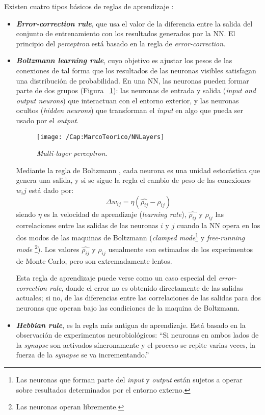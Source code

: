 Existen cuatro tipos básicos de reglas de aprendizaje \cite{Jain:1996:ANN-AT}:
\begin{itemize}
  \item \textbf{\textit{Error-correction rule}}, que usa el valor de la 
  diferencia entre la salida del conjunto de entrenamiento con los resultados
  generados por la NN. El principio del \textit{perceptron} está basado en la 
  regla de \textit{error-correction}.  
  \item \textbf{\textit{Boltzmann learning rule}}, cuyo objetivo es ajustar 
  los pesos de las conexiones de tal forma que los resultados de las neuronas 
  visibles satisfagan una distribución de probabilidad. En una NN, las
  neuronas pueden formar parte de dos grupos (Figura~
  \ref{Fig:cap-marcoteorico:NNLayers}): las neuronas de entrada y salida 
  (\textit{input and output neurons}) que interactuan con el entorno exterior,
  y las neuronas ocultos (\textit{hidden neurons}) que transforman el
  \textit{input} en algo que pueda ser usado por el \textit{output}.
  \begin{figure}[h!]
     \centering
   	\texttt{[image: /Cap:MarcoTeorico/NNLayers]}
     \caption{\textit{Multi-layer perceptron}.}%
     \label{Fig:cap-marcoteorico:NNLayers}
  \end{figure}
  
  Mediante la regla de Boltzmann \cite{Ackley:1985:LAforBM}, cada neurona es 
  una unidad estocástica que genera una salida, y si se sigue la regla el
  cambio de peso de las conexiones $w_ij$ está dado por:
  \begin{equation}
    \Delta w_{ij} = \eta \left( \widehat{\rho_{ij}} - \rho_{ij} \right)
  \end{equation}
siendo $\eta$ es la velocidad de aprendizaje (\textit{learning rate}), 
$\widehat{\rho_{ij}}$ y $\rho_{ij}$ las correlaciones entre las salidas de las
neuronas $i$ y $j$ cuando la NN opera en los dos modos de las maquinas de 
Boltzmann (\textit{clamped mode}\footnote{Las neuronas que forman parte del 
\textit{input} y \textit{output} están sujetos a operar sobre resultados 
determinados por el entorno externo.} y \textit{free-running mode}
\footnote{Las neuronas operan libremente.}). Los valores 
$\widehat{\rho_{ij}}$ y $\rho_{ij}$ usualmente son estimados de los
experimentos de Monte Carlo, pero son extremadamente lentos.

Esta regla de aprendizaje puede verse como un caso especial del \textit{error-
correction rule}, donde el error no es obtenido directamente de las salidas 
actuales; si no, de las diferencias entre las correlaciones de las salidas 
para dos neuronas que operan bajo las condiciones de la maquina de Boltzmann.
  \item \textbf{\textit{Hebbian rule}}, es la regla más antigua de 
  aprendizaje. Está basado en la observación de experimentos neurobiológicos:
  ``Si neuronas en ambos lados de la \textit{synapse} son activados
  síncronamente y el proceso se repite varias veces, la fuerza de la 
  \textit{synapse} se va incrementando.''
  

\end{itemize}
